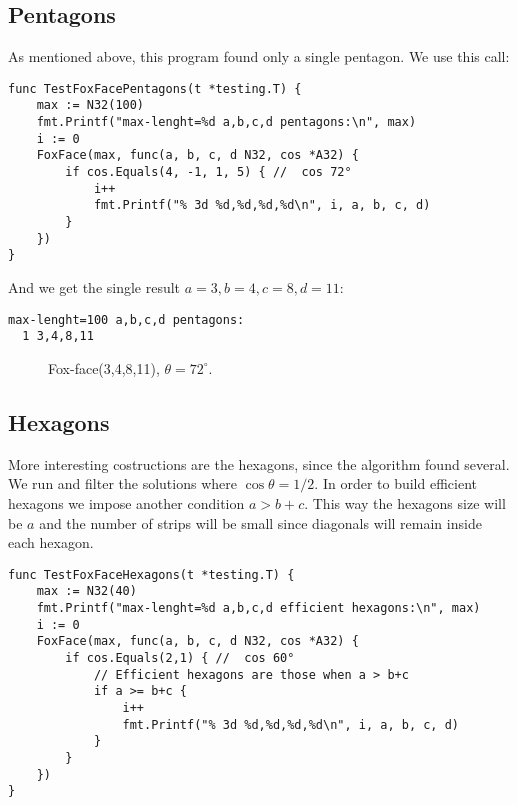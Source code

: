 \documentclass[11pt]{article}
\begin{document}
\subsection{Pentagons}
As mentioned above, this program found only a single pentagon. We use this call:
\begin{lstlisting}
func TestFoxFacePentagons(t *testing.T) {
	max := N32(100)
	fmt.Printf("max-lenght=%d a,b,c,d pentagons:\n", max)
	i := 0
	FoxFace(max, func(a, b, c, d N32, cos *A32) {
		if cos.Equals(4, -1, 1, 5) { //  cos 72°
			i++
			fmt.Printf("% 3d %d,%d,%d,%d\n", i, a, b, c, d)
		}
	})
}
\end{lstlisting}
And we get the single result $a=3, b=4, c=8, d=11$:
\begin{lstlisting}
max-lenght=100 a,b,c,d pentagons:
  1 3,4,8,11
\end{lstlisting}

\begin{figure}[h!]
\centering
{}
\caption{Fox-face(3,4,8,11), $\theta=72^\circ$.}
\end{figure}


\subsection{Hexagons}
More interesting costructions are the hexagons, since the algorithm found several.
We run and filter the solutions where $\cos{\theta} = 1/2$. In order to build efficient
hexagons we impose another condition $a > b+c$. This way the hexagons size will be $a$
and the number of strips will be small since diagonals will remain inside each hexagon.

\begin{lstlisting}
func TestFoxFaceHexagons(t *testing.T) {
	max := N32(40)
	fmt.Printf("max-lenght=%d a,b,c,d efficient hexagons:\n", max)
	i := 0
	FoxFace(max, func(a, b, c, d N32, cos *A32) {
		if cos.Equals(2,1) { //  cos 60°
			// Efficient hexagons are those when a > b+c
			if a >= b+c {
				i++
				fmt.Printf("% 3d %d,%d,%d,%d\n", i, a, b, c, d)
			}
		}
	})
}
\end{lstlisting}
\end{document}
